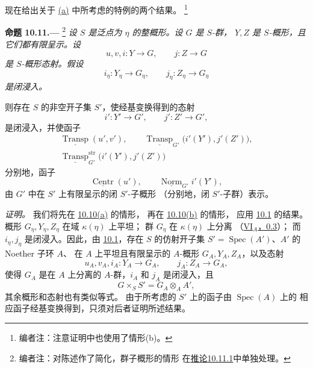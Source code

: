 现在给出关于 \hyperref[par:sga3-VIB-10.10-a]{(a)} 中所考虑的特例的两个结果。%
\footnote{\label{note:sga3-VIB-95}编者注：注意证明中也使用了情形\textup{(b)}。}

\medskip
{}\label{prop:sga3-VIB-10.11}%
\noindent\textbf{命题 10.11.---}%
\footnote{\label{note:sga3-VIB-96}编者注：对陈述作了简化，群子概形的情形
在\hyperref[cor:sga3-VIB-10.11.1]{推论10.11.1}中单独处理。}
\begingroup\itshape
设 \(S\) 是泛点为 \(\eta\) 的整概形。设 \(G\) 是 \(S\)-群，
\(Y,Z\) 是 \(S\)-概形，且它们都有限呈示。设
\[
  u,v,i:Y\longrightarrow G,
  \qquad
  j:Z\longrightarrow G
\]
是 \(S\)-概形态射。假设
\[
  i_\eta:Y_\eta\longrightarrow G_\eta,
  \qquad
  j_\eta:Z_\eta\longrightarrow G_\eta
\]
是闭浸入。

则存在 \(S\) 的非空开子集 \(S'\)，使经基变换得到的态射
\[
  i':Y'\longrightarrow G',
  \qquad
  j':Z'\longrightarrow G',
\]
是闭浸入，并使函子
\label{form:sga3-VIB-10.11-scheme-functors}%
\[
\begin{gathered}
  \underline{\operatorname{Transp}}(u',v'),\qquad
  \underline{\operatorname{Transp}}_{G'}
    \bigl(i'(Y'),j'(Z')\bigr),\\
  \underline{\operatorname{Transp}}^{\mathrm{str}}_{G'}
    \bigl(i'(Y'),j'(Z')\bigr)
\end{gathered}
\]
分别地，函子
\label{form:sga3-VIB-10.11-group-functors}%
\[
  \underline{\operatorname{Centr}}(u'),
  \qquad
  \underline{\operatorname{Norm}}_{G'}i'(Y'),
\]
由 \(G'\) 中在 \(S'\) 上有限呈示的闭 \(S'\)-子概形
\textup{（分别地，闭 \(S'\)-子群）}表示。
\par\endgroup

\emph{证明。}
我们将先在 \hyperref[par:sga3-VIB-10.10-a]{10.10\textup{(a)}} 的情形，
再在 \hyperref[par:sga3-VIB-10.10-b]{10.10\textup{(b)}} 的情形，
应用 \hyperref[par:sga3-VIB-10.1]{10.1} 的结果。
概形 \(G_\eta,Y_\eta,Z_\eta\) 在域 \(\kappa(\eta)\) 上平坦；
群 \(G_\eta\) 在 \(\kappa(\eta)\) 上分离
\textup{（\hyperref[sga3:VIA:0.3]{VI\(_A\)，0.3}）}；
而 \(i_\eta,j_\eta\) 是闭浸入。因此，由
\hyperref[par:sga3-VIB-10.1]{10.1}，存在 \(S\) 的仿射开子集
\(S'=\operatorname{Spec}(A')\)、\(A'\) 的 Noether 子环 \(A\)、
在 \(A\) 上平坦且有限呈示的 \(A\)-概形 \(G_A,Y_A,Z_A\)，以及态射
\[
  u_A,v_A,i_A:Y_A\longrightarrow G_A,
  \qquad
  j_A:Z_A\longrightarrow G_A,
\]
使得 \(G_A\) 是在 \(A\) 上分离的 \(A\)-群，\(i_A\) 和 \(j_A\)
是闭浸入，且
\[
  G\times_SS'=G_A\otimes_AA',
\]
其余概形和态射也有类似等式。
由于所考虑的 \(S'\) 上的函子由 \(\operatorname{Spec}(A)\) 上的
相应函子经基变换得到，只须对后者证明所述结果。


